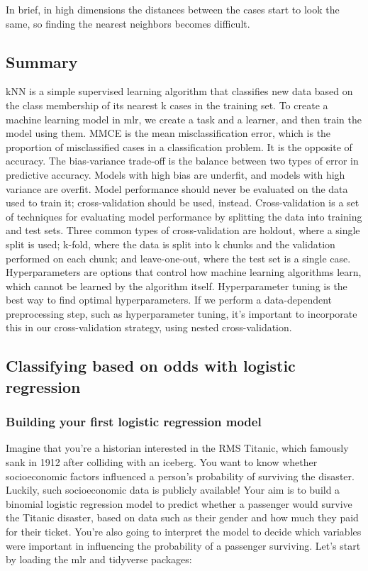 \documentclass[
]{article}
\begin{document}
In brief, in high dimensions the distances between the cases start to
look the same, so finding the nearest neighbors becomes difficult.

\subsection{Summary}\label{summary-1}

kNN is a simple supervised learning algorithm that classifies new data
based on the class membership of its nearest k cases in the training
set. To create a machine learning model in mlr, we create a task and a
learner, and then train the model using them. MMCE is the mean
misclassification error, which is the proportion of misclassified cases
in a classification problem. It is the opposite of accuracy. The
bias-variance trade-off is the balance between two types of error in
predictive accuracy. Models with high bias are underfit, and models with
high variance are overfit. Model performance should never be evaluated
on the data used to train it; cross-validation should be used, instead.
Cross-validation is a set of techniques for evaluating model performance
by splitting the data into training and test sets. Three common types of
cross-validation are holdout, where a single split is used; k-fold,
where the data is split into k chunks and the validation performed on
each chunk; and leave-one-out, where the test set is a single case.
Hyperparameters are options that control how machine learning algorithms
learn, which cannot be learned by the algorithm itself. Hyperparameter
tuning is the best way to find optimal hyperparameters. If we perform a
data-dependent preprocessing step, such as hyperparameter tuning, it's
important to incorporate this in our cross-validation strategy, using
nested cross-validation.

\subsection{Classifying based on odds with logistic
regression}\label{classifying-based-on-odds-with-logistic-regression}

\subsubsection{Building your first logistic regression
model}\label{building-your-first-logistic-regression-model}

Imagine that you're a historian interested in the RMS Titanic, which
famously sank in 1912 after colliding with an iceberg. You want to know
whether socioeconomic factors influenced a person's probability of
surviving the disaster. Luckily, such socioeconomic data is publicly
available! Your aim is to build a binomial logistic regression model to
predict whether a passenger would survive the Titanic disaster, based on
data such as their gender and how much they paid for their ticket.
You're also going to interpret the model to decide which variables were
important in influencing the probability of a passenger surviving. Let's
start by loading the mlr and tidyverse packages:
\end{document}
